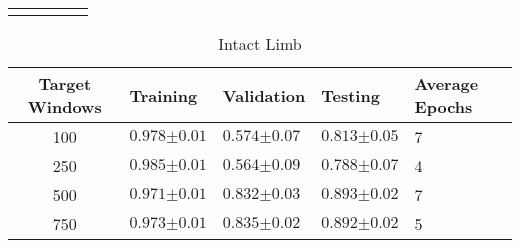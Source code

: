 \begin{table}[H]
\begin{subtable}{\textwidth}
\begin{tabularx}{\textwidth}{cYYYY}
          \\
    \end{tabularx}
    \end{subtable}
\end{table}

\begin{table}[H]
    \centering
    \caption[Table of results for classification performance of 32 unit  networks with the  layer personalised to an amputee using transfer learning.]{Table of results for classification performance of 32 unit  networks with the  layer personalised to an amputee using transfer learning. The table shows the classification accuracy for the target user training, validation and test data sets $\pm\sigma(n = 25)$. A value of one represents 100\% correct classification.}
    \label{tab:amputee-transfer-frozen-dense-table-of-results}
    \begin{subtable}{\textwidth}
    \caption{Intact Limb}
    \begin{tabularx}{\textwidth}{cYYYY}
        Target Windows & Training & Validation & Testing & Average Epochs \\
         & $0.978{\scriptscriptstyle\pm0.01}$ & $0.574{\scriptscriptstyle\pm0.07}$ & $0.813{\scriptscriptstyle\pm0.05}$ & 7 \\
250 & $0.985{\scriptscriptstyle\pm0.01}$ & $0.564{\scriptscriptstyle\pm0.09}$ & $0.788{\scriptscriptstyle\pm0.07}$ & 4 \\
500 & $0.971{\scriptscriptstyle\pm0.01}$ & $0.832{\scriptscriptstyle\pm0.03}$ & $0.893{\scriptscriptstyle\pm0.02}$ & 7 \\
750 & $0.973{\scriptscriptstyle\pm0.01}$ & $0.835{\scriptscriptstyle\pm0.02}$ & $0.892{\scriptscriptstyle\pm0.02}$ & 5 \\


\end{tabularx}
\end{subtable}
\end{table}
